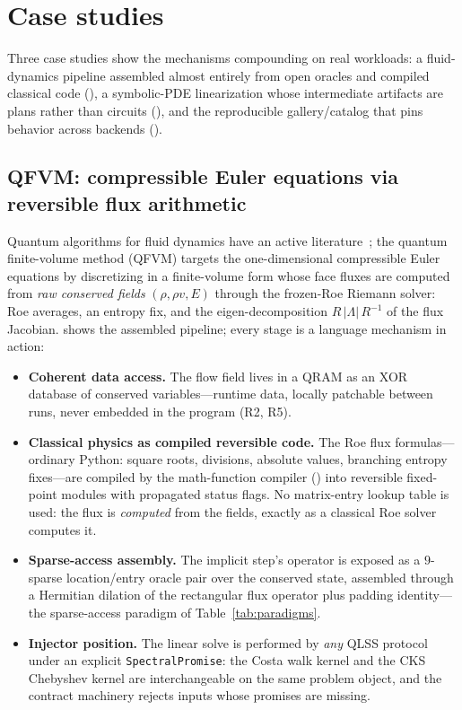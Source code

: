 \section{Case studies}
\label{sec:casestudies}

Three case studies show the mechanisms compounding on real workloads: a
fluid-dynamics pipeline assembled almost entirely from open oracles and
compiled classical code (), a symbolic-PDE linearization
whose intermediate artifacts are plans rather than circuits
(), and the reproducible gallery/catalog that pins
behavior across backends ().

\subsection{QFVM: compressible Euler equations via reversible flux arithmetic}
\label{sec:qfvm}

Quantum algorithms for fluid dynamics have an active literature~\cite{meng2023fluid,bharadwaj2025fluid}; the quantum finite-volume method (QFVM) targets the one-dimensional
compressible Euler equations by discretizing in a finite-volume form whose
face fluxes are computed from \emph{raw conserved fields} $(\rho, \rho v, E)$
through the frozen-Roe Riemann solver: Roe averages, an entropy fix, and the
eigen-decomposition $R\,|\Lambda|\,R^{-1}$ of the flux Jacobian.
 shows the assembled pipeline; every stage is a language
mechanism in action:

\begin{itemize}
\item \textbf{Coherent data access.}  The flow field lives in a QRAM as an
  XOR database of conserved variables---runtime data, locally patchable
  between runs, never embedded in the program (R2, R5).
\item \textbf{Classical physics as compiled reversible code.}  The Roe flux
  formulas---ordinary Python: square roots, divisions, absolute values,
  branching entropy fixes---are compiled by the math-function compiler
  () into reversible fixed-point modules with
  propagated status flags.  No matrix-entry lookup table is used: the flux
  is \emph{computed} from the fields, exactly as a classical Roe solver
  computes it.
\item \textbf{Sparse-access assembly.}  The implicit step's operator is
  exposed as a $9$-sparse location/entry oracle pair over the conserved
  state, assembled through a Hermitian dilation of the rectangular flux
  operator plus padding identity---the sparse-access paradigm of
  Table~\ref{tab:paradigms}.
\item \textbf{Injector position.}  The linear solve is performed by
  \emph{any} QLSS protocol under an explicit \texttt{SpectralPromise}: the
  Costa walk kernel and the CKS Chebyshev kernel are interchangeable on the
  same problem object, and the contract machinery rejects inputs whose
  promises are missing.
\end{itemize}

